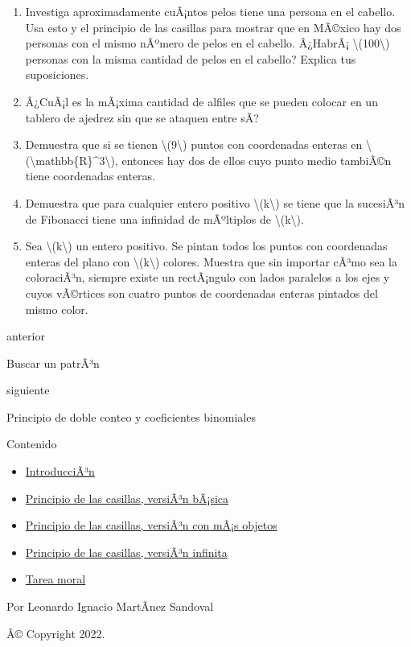 \documentclass[
]{article}
\providecommand{\tightlist}{%
  \setlength{\itemsep}{0pt}\setlength{\parskip}{0pt}}
\begin{document}
\begin{enumerate}
\item
  Investiga aproximadamente cuÃ¡ntos pelos tiene una persona en el
  cabello. Usa esto y el principio de las casillas para mostrar que en
  MÃ©xico hay dos personas con el mismo nÃºmero de pelos en el cabello.
  Â¿HabrÃ¡ {\textbackslash(100\textbackslash)} personas con la misma
  cantidad de pelos en el cabello? Explica tus suposiciones.
\item
  Â¿CuÃ¡l es la mÃ¡xima cantidad de alfiles que se pueden colocar en un
  tablero de ajedrez sin que se ataquen entre sÃ­?
\item
  Demuestra que si se tienen {\textbackslash(9\textbackslash)} puntos
  con coordenadas enteras en
  {\textbackslash(\textbackslash mathbb\{R\}\^{}3\textbackslash)},
  entonces hay dos de ellos cuyo punto medio tambiÃ©n tiene coordenadas
  enteras.
\item
  Demuestra que para cualquier entero positivo
  {\textbackslash(k\textbackslash)} se tiene que la sucesiÃ³n de
  Fibonacci tiene una infinidad de mÃºltiplos de
  {\textbackslash(k\textbackslash)}.
\item
  Sea {\textbackslash(k\textbackslash)} un entero positivo. Se pintan
  todos los puntos con coordenadas enteras del plano con
  {\textbackslash(k\textbackslash)} colores. Muestra que sin importar
  cÃ³mo sea la coloraciÃ³n, siempre existe un rectÃ¡ngulo con lados
  paralelos a los ejes y cuyos vÃ©rtices son cuatro puntos de
  coordenadas enteras pintados del mismo color.
\end{enumerate}

\href{BuscarPatron.html}{\emph{}}

anterior

Buscar un patrÃ³n

\href{DobleConteo.html}{}

siguiente

Principio de doble conteo y coeficientes binomiales

\emph{}

\emph{} Contenido

\begin{itemize}
\tightlist
\item
  \hyperref[introduccion]{IntroducciÃ³n}
\item
  \hyperref[principio-de-las-casillas-version-basica]{Principio de las
  casillas, versiÃ³n bÃ¡sica}
\item
  \hyperref[principio-de-las-casillas-version-con-mas-objetos]{Principio
  de las casillas, versiÃ³n con mÃ¡s objetos}
\item
  \hyperref[principio-de-las-casillas-version-infinita]{Principio de las
  casillas, versiÃ³n infinita}
\item
  \hyperref[tarea-moral]{Tarea moral}
\end{itemize}

Por Leonardo Ignacio MartÃ­nez Sandoval

Â© Copyright 2022.\\
\end{document}
